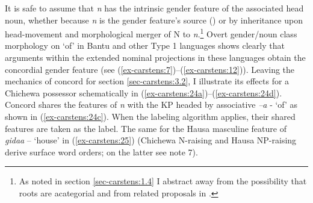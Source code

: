 \documentclass[output=paper
,modfonts
,nonflat]{langsci/langscibook}
\begin{document}
It is safe to assume that \textit{n} has the intrinsic gender feature of the associated head noun, whether because \textit{n} is the gender feature's source (\citealt{Lecarme2002,Kihm2005,Kramer2015}) or by inheritance upon head-movement and morphological merger of N to \textit{n}.\footnote{As noted in section \ref{sec-carstens:1.4} I abstract away from the possibility that roots are acategorial and from related proposals in \citet{Chomsky2015}.} Overt gender/noun class morphology on `of' in Bantu and other Type 1 languages shows clearly that arguments within the extended nominal projections in these languages obtain the concordial gender feature (see (\ref{ex-carstens:7})--(\ref{ex-carstens:12})). Leaving the mechanics of concord for section \ref{sec-carstens:3.2}, I illustrate its effects for a Chichewa possessor schematically in (\ref{ex-carstens:24a})--(\ref{ex-carstens:24d}). Concord shares the features of \textit{n} with the KP headed by associative \textit{–a} - ‘of’ as shown in (\ref{ex-carstens:24c}). When the labeling algorithm applies, their shared features are taken as the label. The same for the Hausa masculine feature of \textit{gidaa} – `house' in (\ref{ex-carstens:25}) (Chichewa N-raising and Hausa NP-raising derive surface word orders; on the latter see note 7). 
\end{document}
